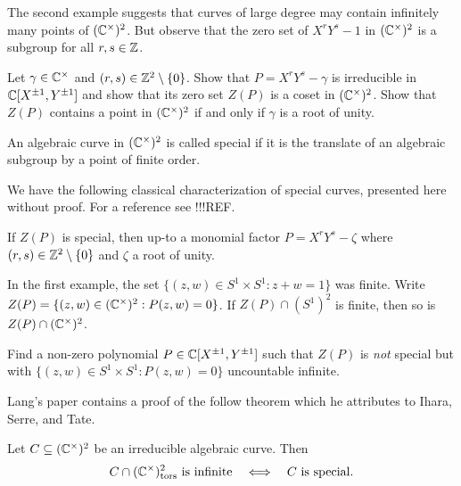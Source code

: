 The second example suggests that curves of large degree may contain
infinitely many points of $({\mathbb{C}}^\times)^2$. But observe that the zero
set of $X^{r}Y^{s}-1$ in $({\mathbb{C}}^\times)^2$ is a subgroup for all
$r,s\in{\mathbb{Z}}$. 

\begin{exercise}
  \label{exer:infinitemany}
  Let $\gamma\in {\mathbb{C}}^\times$ and $(r,s)\in{\mathbb{Z}}^2\setminus
  \{0\}$. Show that $P=X^rY^s-\gamma$ is irreducible in ${\mathbb{C}}[X^{\pm
    1},Y^{\pm 1}]$ and show that its zero set $Z(P)$ is a coset in
  $({\mathbb{C}}^\times)^2$. Show that $Z(P)$ contains a point in
  $({\mathbb{C}}^\times)^2$ if and only if $\gamma$ is a root of unity. 
\end{exercise}

\begin{definition}
  An algebraic curve in $({\mathbb{C}}^\times)^2$
  is called special if it is the translate of an algebraic subgroup by
  a point of finite order. 
\end{definition}

We have the following classical characterization of special curves,
presented here without proof. For a reference see !!!REF. 

\begin{lemma}
  \label{lem:specialGm2}
  If $Z(P)$ is special, then up-to a monomial factor
  $P=X^rY^s-\zeta$ where $(r,s)\in{\mathbb{Z}}^2\setminus\{0\}$
  and $\zeta$ a root of unity. 
\end{lemma}


In the first example, the set $\{(z,w) \in S^1\times S^1 : z+w=1\}$
was finite. Write $Z(P) = \{(z,w) \in ({\mathbb{C}}^\times)^2 : P(z,w)=0\}$. If
$Z(P)\cap (S^1)^2$ is finite, then so is $Z(P) \cap ({\mathbb{C}}^\times)^2$.

\begin{exercise}
  \label{exer:toralpoly}
  Find a non-zero polynomial $P\in {\mathbb{C}}[X^{\pm 1},Y^{\pm 1}]$ such that
  $Z(P)$ is \emph{not} special but with $\{(z,w)\in S^1 \times S^1 :
  P(z,w)=0\}$ uncountable infinite.  
\end{exercise}

Lang's paper contains a proof of the follow theorem which he
attributes to Ihara, Serre, and Tate.

\begin{theorem}
  \label{thm:ist}
  Let $C\subseteq ({\mathbb{C}}^\times)^2$ be an irreducible algebraic curve.
  Then
  \begin{equation*}
    C \cap ({\mathbb{C}}^\times)^2_{\mathrm{tors}}\text{ is infinite}\quad\Longleftrightarrow\quad \text{$C$ is special}. 
  \end{equation*}
\end{theorem}

